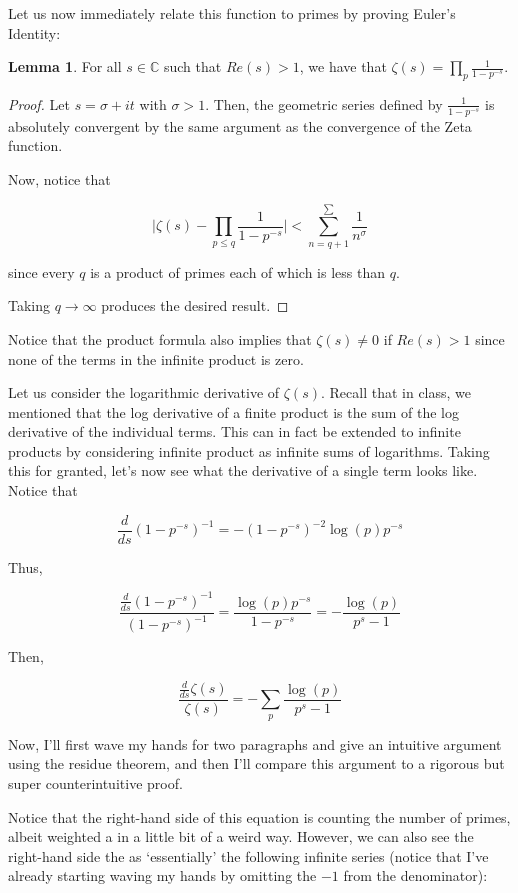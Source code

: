 \documentclass{article}
\theoremstyle{definition}
\newtheorem{lemma}[theorem]{Lemma}
\newcommand{\C}{\mathbb{C}}
\begin{document}
Let us now immediately relate this function to primes by proving Euler's Identity:

\begin{lemma}
    For all $ s \in \C $ such that $ Re(s) > 1 $, we have that $ \zeta(s) = \prod_{p} \frac{1}{1 - p^{-s}} $.
\end{lemma}

\begin{proof}
    Let $ s = \sigma + it $ with $ \sigma > 1 $.
    Then, the geometric series defined by $ \frac{1}{1 - p^{-s}} $ is absolutely convergent by the
    same argument as the convergence of the Zeta function.

    Now, notice that

    \[ \lvert \zeta(s) - \prod_{p \leq q} \frac{1}{1 - p^{-s}} \rvert < \sum_{n = q + 1}^{\sum} \frac{1}{n^{\sigma}} \]

    since every $ q $ is a product of primes each of which is less than $ q $.

    Taking $ q \to \infty $ produces the desired result.
\end{proof}

Notice that the product formula also implies that $ \zeta(s) \neq 0 $ if $ Re(s) > 1 $ since
none of the terms in the infinite product is zero.

Let us consider the logarithmic derivative of $ \zeta(s) $.
Recall that in class, we mentioned that the log derivative of a finite product is the sum of the
log derivative of the individual terms. This can in fact be extended to infinite products
by considering infinite product as infinite sums of logarithms. Taking this for granted,
let's now see what the derivative of a single term looks like. Notice that


\[ \frac{d}{ds} (1 - p^{-s})^{-1} = - (1 - p^{-s})^{-2} \log(p) p^{-s}\]

Thus, 

\[ \frac{\frac{d}{ds} (1 - p^{-s})^{-1}}{(1 - p^{-s})^{-1}} = \frac{\log(p) p^{-s}}{1 - p^{-s}} = - \frac{\log (p)}{p^{s} - 1} \]

Then, 

\[ \frac{\frac{d}{ds} \zeta(s)}{\zeta(s)} = - \sum_{p} \frac{\log (p)}{p^{s} - 1} \]


Now, I'll first wave my hands for two paragraphs and give an intuitive argument
using the residue theorem, and then I'll compare this argument to a rigorous
but super counterintuitive proof.

Notice that the right-hand side of this equation is counting the number of primes, albeit
weighted a in a little bit of a weird way. However, we can also see the right-hand side the as
`essentially' the following infinite series (notice that I've already starting waving my hands
by omitting the $ -1 $ from the denominator):
\end{document}
